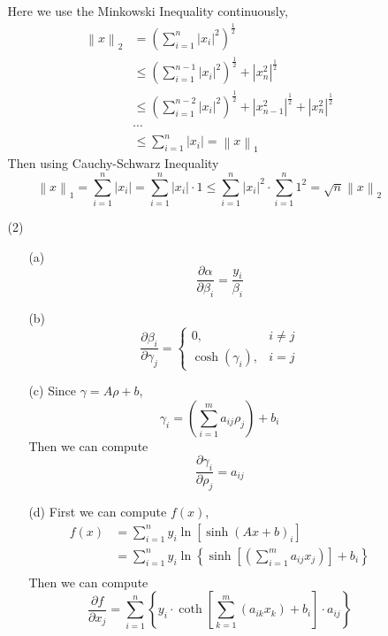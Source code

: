 \documentclass[a4paper,12pt]{article}
\begin{document}
\begin{enumerate}
\begin{itemize}
Here we use the Minkowski Inequality continuously,
\begin{align*}
\left \| x \right \|_2 
&= \left ( \sum_{i=1}^n |x_i|^2 \right )^{\frac{1}{2}} \\
&\le \left ( \sum_{i=1}^{n-1} |x_i|^2 \right )^{\frac{1}{2}} + |x_n^2|^{\frac{1}{2}}\\
&\le \left ( \sum_{i=1}^{n-2} |x_i|^2 \right )^{\frac{1}{2}} + |x_{n-1}^2|^{\frac{1}{2}} + |x_n^2|^{\frac{1}{2}}\\
& \cdots \\
&\le \sum_{i=1}^n |x_i| = \left \| x \right \|_1
\end{align*}
Then using Cauchy-Schwarz Inequality
$$
\left \| x \right \|_1 = \sum_{i=1}^n |x_i| = \sum_{i=1}^n |x_i| \cdot 1 \le \sum_{i=1}^n |x_i|^2 \cdot \sum_{i=1}^n 1^2 = \sqrt{n} \left \| x \right \|_2
$$

\clearpage
\item[(2)]
\begin{itemize}
\item[(a)]
$$
\frac{\partial \alpha}{\partial \beta_i} = \frac{y_i}{\beta_i}
$$

\item[(b)]
$$
\frac{\partial \beta_i}{\partial \gamma_j} = 
\begin{cases}
0, & i \ne j\\
\cosh(\gamma_i), & i=j
\end{cases}
$$

\item[(c)]
Since $\gamma = A \rho + b$,
$$
\gamma_i = \left( \sum_{i=1}^m a_{ij} \rho_j\right ) + b_i
$$
Then we can compute
$$
\frac{\partial \gamma_i}{\partial \rho_j} = a_{ij}
$$

\item[(d)]
First we can compute $f(x)$,
\begin{align*}
f(x) &= \sum_{i=1}^n y_i \ln \left[ \sinh(Ax+b)_i \right] \\
       &= \sum_{i=1}^n y_i \ln \left \{ \sinh \left [ \left( \sum_{i=1}^m a_{ij} x_j\right ) \right ]+ b_i \right \} \\
\end{align*}
Then we can compute
$$
\frac{\partial f}{\partial x_j} = \sum_{i=1}^n \left \{ y_i \cdot \coth \left [ \sum_{k=1}^m (a_{ik} x_k) + b_i\right ] \cdot a_{ij}\right \}
$$
\end{itemize}


\end{itemize}
\end{enumerate}
\end{document}
